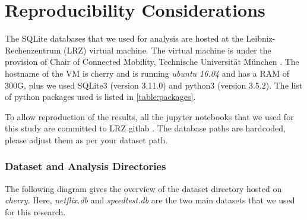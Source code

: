 \chapter{Reproducibility Considerations}\label{chapter:9}

The SQLite databases that we used for analysis are hosted at the Leibniz-Rechenzentrum (LRZ) virtual machine. The virtual machine is under the provision of Chair of Connected Mobility, 
Technische Universität München \cite{tum}. The hostname of the VM is cherry and is running \textit{ubuntu 16.04} and has a RAM of 300G, plus we used SQLite3 (version 3.11.0) and python3
(version 3.5.2). The list of python packages used is listed in \cref{table:packages}.

To allow reproduction of the results, all the jupyter notebooks that we used for this study are committed to LRZ gitlab \cite{gitlab}. The database paths are hardcoded, please adjust them as per your dataset path.

\subsection*{Dataset and Analysis Directories}

The following diagram gives the overview of the dataset directory hosted on \textit{cherry}. Here, \textit{netflix.db} and \textit{speedtest.db} are the two main datasets that we used for this research.



